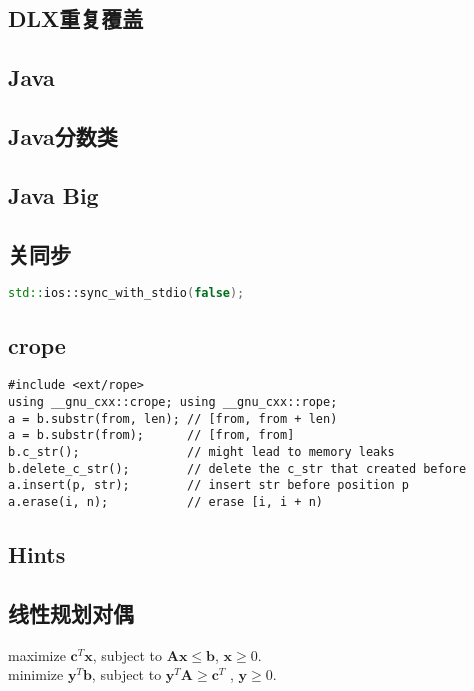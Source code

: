 \documentclass[landscape,a4paper]{article}
\begin{document}
\begin{spacing}{0.3}
\begin{multicols}{3}
	\subsection{DLX重复覆盖}
	
	\subsection{Java}
	
	\subsection{Java分数类}
	
	\subsection{Java Big}
	
\subsection{关同步}
\begin{lstlisting}[language=C++]
    std::ios::sync_with_stdio(false);
\end{lstlisting}
	\subsection{crope}
	\begin{lstlisting}
#include <ext/rope>
using __gnu_cxx::crope; using __gnu_cxx::rope;
a = b.substr(from, len); // [from, from + len)
a = b.substr(from);      // [from, from]
b.c_str();               // might lead to memory leaks
b.delete_c_str();        // delete the c_str that created before
a.insert(p, str);        // insert str before position p
a.erase(i, n);           // erase [i, i + n)

	\end{lstlisting}	
	\end{multicols}

	\begin{multicols}{2}%
	\section{Hints}

	\subsection{线性规划对偶}
	maximize $\bm{c}^T\bm{x}$, subject to $\bm{Ax} \leq \bm{b}$, $\bm{x} \geq 0$.\\
	minimize $\bm{y}^T\bm{b}$, subject to $\bm{y}^T\bm{A} \geq \bm{c}^T$ , $\bm{y} \geq 0$.

\end{multicols}
\end{spacing}
\end{document}

